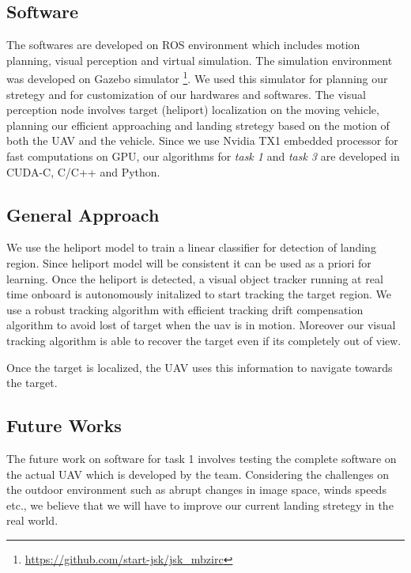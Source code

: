 \documentclass{standalone}
\begin{document}
\subsection{Software}

The softwares are developed on ROS environment which includes motion planning, visual perception and virtual simulation. The simulation environment was developed on Gazebo simulator \footnote{\url{https://github.com/start-jsk/jsk_mbzirc}}. We used this simulator for planning our stretegy and for customization of our hardwares and softwares. The visual perception node involves target (heliport) localization on the moving vehicle, planning our efficient approaching and landing stretegy based on the motion of both the UAV and the vehicle. Since we use Nvidia TX1 embedded processor for fast computations on GPU, our algorithms for \textit{task 1} and \textit{task 3} are developed in CUDA-C, C/C++ and Python. 



\subsection{General Approach}

We use the heliport model to train a linear classifier for detection of landing region. Since heliport model will be consistent it can be used as a priori for learning. Once the heliport is detected, a visual object tracker running at real time onboard is autonomously initalized to start tracking the target region. We use a robust tracking algorithm with efficient tracking drift compensation algorithm to avoid lost of target when the uav is in motion. Moreover our visual tracking algorithm is able to recover the target even if its completely out of view.


Once the target is localized, the UAV uses this information to navigate towards the target. 



\subsection{Future Works}
The future work on software for task 1 involves testing the complete software on the actual UAV which is developed by the team. Considering the challenges on the outdoor environment such as abrupt changes in image space, winds speeds etc., we believe that we will have to improve our current landing stretegy in the real world. 
\end{document}
